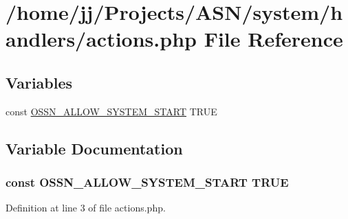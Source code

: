 \hypertarget{actions_8php}{}\section{/home/jj/\+Projects/\+A\+S\+N/system/handlers/actions.php File Reference}
\label{actions_8php}
\subsection*{Variables}
\begin{DoxyCompactItemize}
\item 
const \hyperlink{actions_8php_a73aeae1243c8451cb328ddfe84637175}{O\+S\+S\+N\+\_\+\+A\+L\+L\+O\+W\+\_\+\+S\+Y\+S\+T\+E\+M\+\_\+\+S\+T\+A\+RT} T\+R\+UE
\end{DoxyCompactItemize}


\subsection{Variable Documentation}
\subsubsection[{\texorpdfstring{O\+S\+S\+N\+\_\+\+A\+L\+L\+O\+W\+\_\+\+S\+Y\+S\+T\+E\+M\+\_\+\+S\+T\+A\+RT}{OSSN_ALLOW_SYSTEM_START}}]{\setlength{\rightskip}{0pt plus 5cm}const O\+S\+S\+N\+\_\+\+A\+L\+L\+O\+W\+\_\+\+S\+Y\+S\+T\+E\+M\+\_\+\+S\+T\+A\+RT T\+R\+UE}\hypertarget{actions_8php_a73aeae1243c8451cb328ddfe84637175}{}\label{actions_8php_a73aeae1243c8451cb328ddfe84637175}


Definition at line 3 of file actions.\+php.


